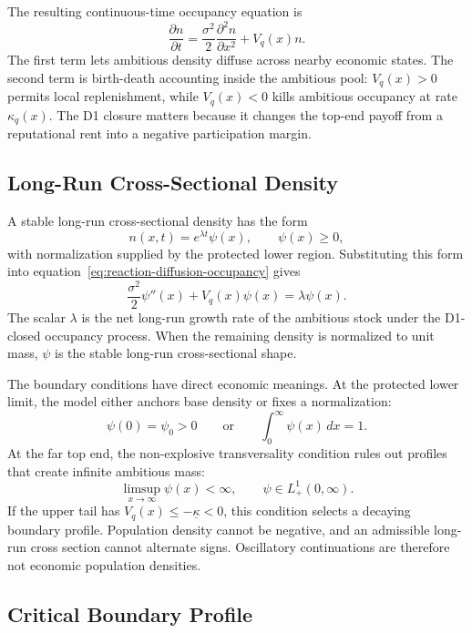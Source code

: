 The resulting continuous-time occupancy equation is
\begin{equation}
\frac{\partial n}{\partial t}
=
\frac{\sigma^2}{2}\frac{\partial^2 n}{\partial x^2}
+V_q(x)n.
\label{eq:reaction-diffusion-occupancy}
\end{equation}
The first term lets ambitious density diffuse across nearby economic states. The second term is birth-death accounting inside the ambitious pool: \(V_q(x)>0\) permits local replenishment, while \(V_q(x)<0\) kills ambitious occupancy at rate \(\kappa_q(x)\). The D1 closure matters because it changes the top-end payoff from a reputational rent into a negative participation margin.

\subsection{Long-Run Cross-Sectional Density}

A stable long-run cross-sectional density has the form
\[
n(x,t)=e^{\lambda t}\psi(x),
\qquad
\psi(x)\ge0,
\]
with normalization supplied by the protected lower region. Substituting this form into equation~\eqref{eq:reaction-diffusion-occupancy} gives
\begin{equation}
\frac{\sigma^2}{2}\psi''(x)+V_q(x)\psi(x)=\lambda\psi(x).
\label{eq:stationary-occupancy-density}
\end{equation}
The scalar \(\lambda\) is the net long-run growth rate of the ambitious stock under the D1-closed occupancy process. When the remaining density is normalized to unit mass, \(\psi\) is the stable long-run cross-sectional shape.

The boundary conditions have direct economic meanings. At the protected lower limit, the model either anchors base density or fixes a normalization:
\[
\psi(0)=\psi_0>0
\qquad\text{or}\qquad
\int_0^\infty \psi(x)\,dx=1.
\]
At the far top end, the non-explosive transversality condition rules out profiles that create infinite ambitious mass:
\[
\limsup_{x\to\infty}\psi(x)<\infty,
\qquad
\psi\in L^1_+(0,\infty).
\]
If the upper tail has \(V_q(x)\le -\underline\kappa<0\), this condition selects a decaying boundary profile. Population density cannot be negative, and an admissible long-run cross section cannot alternate signs. Oscillatory continuations are therefore not economic population densities.

\subsection{Critical Boundary Profile}

